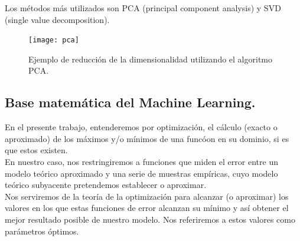 \documentclass[a4paper,11pt]{article}
\begin{document}
\noindent
Los métodos más utilizados son PCA (principal component analysis) y SVD (single value decomposition).

\begin{figure}[H]
\centering
\texttt{[image: pca]}
\caption{Ejemplo de reducción de la dimensionalidad utilizando el algoritmo PCA.}
\end{figure}

\subsection{ Base matemática del Machine Learning.}
\label{}

En el presente trabajo, entenderemos por optimización, el cálculo (exacto o
aproximado) de los máximos y/o mínimos de una funcóon en su dominio, si es
que estos existen.\\

\noindent
En nuestro caso, nos restringiremos a funciones que miden el error entre
un modelo teórico aproximado y una serie de muestras empíricas, cuyo modelo
teórico subyacente pretendemos establecer o aproximar.\\

\noindent
Nos serviremos de la teoría de la optimización para alcanzar (o aproximar) los valores en los que estas funciones de error alcanzan su mínimo y así obtener el mejor resultado posible de nuestro modelo. Nos referiremos a estos valores como parámetros óptimos.
\end{document}
